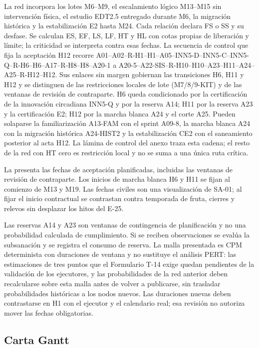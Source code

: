 La red incorpora los lotes M6--M9, el escalamiento lógico M13--M15 sin intervención física,
el estudio EDT2.5 entregado durante M6, la migración histórica y la estabilización E2 hasta M24.
Cada relación declara FS o SS y su desfase. Se calculan ES, EF, LS, LF, HT y HL con cotas
propias de liberación y límite; la criticidad se interpreta contra esas fechas. La secuencia de
control que fija la aceptación H12 recorre A01--A02--R-H1--H1--A05--INN5-D--INN5-C--INN5-Q--R-H6--H6--A17--R-H8--H8--A20-1 a A20-5--A22-SIS--R-H10--H10--A23--H11--A24--A25--R-H12--H12. Sus
enlaces sin margen gobiernan las transiciones H6, H11 y H12 y se distinguen de las restricciones
locales de lote (M7/8/9-KIT) y de las ventanas de revisión de contraparte. H6 queda condicionado
por la certificación de la innovación circadiana INN5-Q y por la reserva A14; H11 por la reserva
A23 y la certificación E2; H12 por la marcha blanca A24 y el corte A25. Pueden solaparse la
familiarización A13-FAM con el sprint A09-8, la marcha blanca A24 con la migración histórica
A24-HIST2 y la estabilización CE2 con el saneamiento posterior al acta H12. La lámina de control
del anexo traza esta cadena; el resto de la red con HT cero es restricción local y no se suma a
una única ruta crítica.

La  presenta las fechas de aceptación planificadas, incluidas las ventanas de
revisión de contraparte. Los inicios de marcha blanca H6 y H11 se fijan al comienzo de M13 y M19.
Las fechas civiles son una visualización de SA-01; al fijar el inicio contractual se contrastan
contra temporada de fruta, cierres y relevos sin desplazar los hitos del E-25.



Las reservas A14 y A23 son ventanas de contingencia de planificación y no una probabilidad
calculada de cumplimiento. Si se reciben observaciones se evalúa la subsanación y se registra
el consumo de reserva. La malla presentada es CPM determinista con duraciones de ventana y no
sustituye el análisis PERT: las estimaciones de tres puntos que el Formulario T-14 exige quedan
pendientes de la validación de los ejecutores, y las probabilidades de la red anterior deben
recalcularse sobre esta malla antes de volver a publicarse, sin trasladar probabilidades
históricas a los nodos nuevos. Las duraciones nuevas deben contrastarse en H1 con el ejecutor
y el calendario real; esa revisión no autoriza mover las fechas obligatorias.

\subsection{Carta Gantt}\label{sec:7-gantt}

